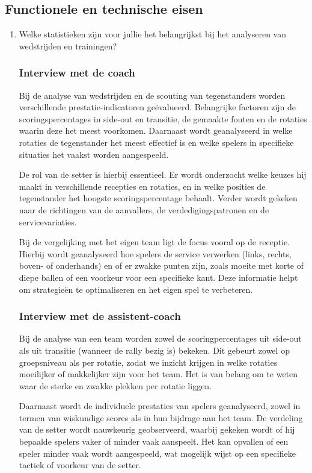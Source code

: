 \subsection{Functionele en technische eisen}
\begin{enumerate}
  \item Welke statistieken zijn voor jullie het belangrijkst bij het analyseren van wedstrijden en trainingen?
  \subsubsection{Interview met de coach}
  Bij de analyse van wedstrijden en de scouting van tegenstanders worden verschillende prestatie-indicatoren geëvalueerd. Belangrijke factoren zijn de scoringspercentages in side-out en transitie, de gemaakte fouten en de rotaties waarin deze het meest voorkomen. Daarnaast wordt geanalyseerd in welke rotaties de tegenstander het meest effectief is en welke spelers in specifieke situaties het vaakst worden aangespeeld.

  De rol van de setter is hierbij essentieel. Er wordt onderzocht welke keuzes hij maakt in verschillende recepties en rotaties, en in welke posities de tegenstander het hoogste scoringspercentage behaalt. Verder wordt gekeken naar de richtingen van de aanvallers, de verdedigingspatronen en de servicevariaties.
  
  Bij de vergelijking met het eigen team ligt de focus vooral op de receptie. Hierbij wordt geanalyseerd hoe spelers de service verwerken (links, rechts, boven- of onderhands) en of er zwakke punten zijn, zoals moeite met korte of diepe ballen of een voorkeur voor een specifieke kant. Deze informatie helpt om strategieën te optimaliseren en het eigen spel te verbeteren.
  \subsubsection{Interview met de assistent-coach}
  Bij de analyse van een team worden zowel de scoringpercentages uit side-out als uit transitie (wanneer de rally bezig is) bekeken. Dit gebeurt zowel op groepsniveau als per rotatie, zodat we inzicht krijgen in welke rotaties moeilijker of makkelijker zijn voor het team. Het is van belang om te weten waar de sterke en zwakke plekken per rotatie liggen.

  Daarnaast wordt de individuele prestaties van spelers geanalyseerd, zowel in termen van wiskundige scores als in hun bijdrage aan het team. De verdeling van de setter wordt nauwkeurig geobserveerd, waarbij gekeken wordt of hij bepaalde spelers vaker of minder vaak aanspeelt. Het kan opvallen of een speler minder vaak wordt aangespeeld, wat mogelijk wijst op een specifieke tactiek of voorkeur van de setter.


\end{enumerate}

